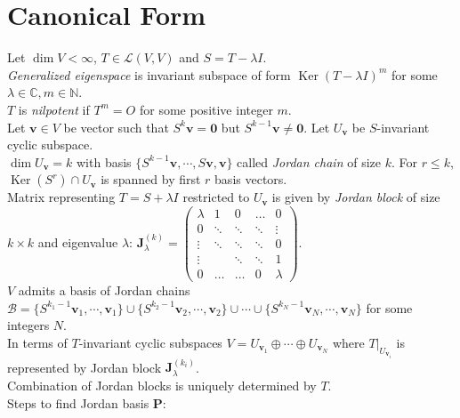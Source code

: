 \documentclass{article}
\theoremstyle{definition}
\DeclareMathOperator{\Ker}{Ker}
\begin{document}
\section{Canonical Form}
Let $\dim{V}<\infty$, $T\in\mathscr{L}(V,V)$ and $S=T-\lambda I$.\\
\textit{Generalized eigenspace} is invariant subspace of form $\Ker(T-\lambda I)^{m}$ for some $\lambda\in\mathbb{C},m\in\mathbb{N}$.\\
$T$ is \textit{nilpotent} if $T^{m}=O$ for some positive integer $m$.\\
Let $\mathbf{v}\in V$ be vector such that $S^{k}\mathbf{v}=\mathbf{0}$ but $S^{k-1}\mathbf{v}\neq\mathbf{0}$. Let $U_{\mathbf{v}}$ be $S$-invariant cyclic subspace.\\
$\dim{U_{\mathbf{v}}}=k$ with basis $\{S^{k-1}\mathbf{v},\cdots,S\mathbf{v},\mathbf{v}\}$ called \textit{Jordan chain} of size $k$. For $r\leq k$, $\Ker(S^{r})\cap U_{\mathbf{v}}$ is spanned by first $r$ basis vectors.\\
Matrix representing $T=S+\lambda I$ restricted to $U_{\mathbf{v}}$ is given by \textit{Jordan block} of size $k\times k$ and eigenvalue $\lambda$: $\mathbf{J}_{\lambda}^{(k)}=\begin{pmatrix}
    \lambda & 1 & 0 & \hdots & 0\\
    0 & \ddots & \ddots & \ddots & \vdots\\
    \vdots & \ddots & \ddots & \ddots & 0\\
    \vdots & & \ddots & \ddots & 1\\
    0 & \hdots & \hdots & 0 & \lambda
\end{pmatrix}$.\\
$V$ admits a basis of Jordan chains $\mathcal{B}=\{S^{k_{1}-1}\mathbf{v}_{1},\cdots,\mathbf{v}_{1}\}\cup\{S^{k_{2}-1}\mathbf{v}_{2},\cdots,\mathbf{v}_{2}\}\cup\cdots\cup\{S^{k_{N}-1}\mathbf{v}_{N},\cdots,\mathbf{v}_{N}\}$ for some integers $N$.\\
In terms of $T$-invariant cyclic subspaces $V=U_{\mathbf{v}_{1}}\oplus\cdots\oplus U_{\mathbf{v}_{N}}$ where $T\vert_{U_{\mathbf{v}_{i}}}$ is represented by Jordan block $\mathbf{J}_{\lambda}^{(k_{i})}$.\\
Combination of Jordan blocks is uniquely determined by $T$.\\
Steps to find Jordan basis $\mathbf{P}$:
\end{document}
